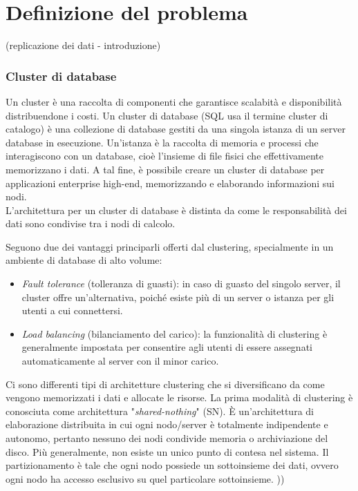 %
\chapter{Definizione del problema}
\setcounter{section}{1}
(replicazione dei dati - introduzione)
\item
\subsection{Cluster di database}
Un cluster \`{e} una raccolta di componenti che garantisce scalabit\`{a} e disponibilit\`{a} distribuendone i costi. Un cluster di database (SQL usa il termine cluster di catalogo) \`{e} una collezione di database gestiti da una singola istanza di un server database in esecuzione. Un'istanza \`{e} la raccolta di memoria e processi che interagiscono con un database, cio\`{e} l'insieme di file fisici che effettivamente memorizzano i dati.\cite{etichetta1} A tal fine, \`{e} possibile creare un cluster di database per applicazioni enterprise high-end, memorizzando e elaborando informazioni sui nodi.\\ L'architettura per un cluster di database \`{e} distinta da come le responsabilit\`{a} dei dati sono condivise tra i nodi di calcolo.

Seguono due dei vantaggi principarli offerti dal clustering, specialmente in un ambiente di database di alto volume:
\begin{itemize}
\item 
\textit{Fault tolerance} (tolleranza di guasti): in caso di guasto del singolo server, il cluster offre un'alternativa, poich\'{e} esiste pi\`{u} di un server o istanza per gli utenti a cui connettersi.
\item
\textit{Load balancing} (bilanciamento del carico): la funzionalit\`{a} di clustering \`{e} generalmente impostata per consentire agli utenti di essere assegnati automaticamente al server con il minor carico.\cite{etichetta1} 
\end{itemize}
Ci sono differenti tipi di architetture clustering che si diversificano da come vengono memorizzati i dati e allocate le risorse.
La prima modalit\`{a} di clustering \`{e} conosciuta come architettura "\textit{shared-nothing}" (SN). \`{E} un'architettura di elaborazione distribuita in cui ogni nodo/server \`{e} totalmente indipendente e autonomo, pertanto nessuno dei nodi condivide memoria o archiviazione del disco. Pi\`{u} generalmente, non esiste un unico punto di contesa nel sistema.\cite{etichetta5} Il partizionamento \`{e} tale che ogni nodo possiede un sottoinsieme dei dati, ovvero ogni nodo ha accesso esclusivo su quel particolare sottoinsieme. 
\cite{etichetta2}))\\

